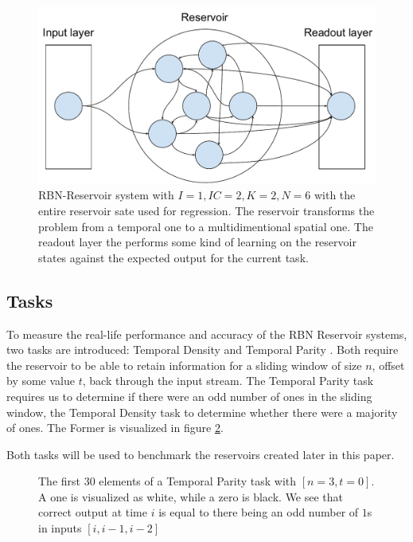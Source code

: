 \begin{figure}
  \centering
  \includegraphics[width=\columnwidth]{background/RBN-Reservoir.pdf}
  \caption{
    RBN-Reservoir system with $I=1, IC=2, K=2, N=6$ with the entire reservoir sate used for regression.
    The reservoir transforms the problem from a temporal one to a multidimentional spatial one.
    The readout layer the performs some kind of learning on the reservoir states against the expected output for the current task.}
  \label{figure:rbn-reservoir}
\end{figure}

\subsection{Tasks}
\label{section:tasks}

To measure the real-life performance and accuracy of the RBN Reservoir systems,
two tasks are introduced: Temporal Density and Temporal Parity \cite{rbn-reservoir}.
Both require the reservoir to be able to retain information for a sliding window of size $ n $,
offset by some value $ t $, back through the input stream.
The Temporal Parity task requires us to determine if there were an odd number of ones in the sliding window,
the Temporal Density task to determine whether there were a majority of ones.
The Former is visualized in figure \ref{figure:temporal-parity}.

Both tasks will be used to benchmark the reservoirs created later in this paper.

\begin{figure}


  \caption{
    The first 30 elements of a Temporal Parity task with $[n=3, t=0]$.
    A one is visualized as white, while a zero is black.
    We see that correct output at time $i$ is equal to there being an odd number of $1$s in inputs $[i, i-1, i-2]$
  }
  \label{figure:temporal-parity}
\end{figure}

